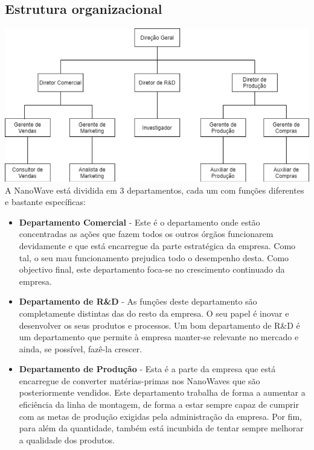\documentclass[a4paper]{article}
\begin{document}
\subsection{Estrutura organizacional}
\includegraphics[scale=0.7]{Imagem1.png}\\
A NanoWave está dividida em 3 departamentos, cada um com funções diferentes e bastante específicas:
\begin{itemize}
    \item \textbf{Departamento Comercial} - Este é o departamento onde estão concentradas as ações que fazem todos os outros órgãos funcionarem devidamente e que está encarregue da parte estratégica da empresa. Como tal, o seu mau funcionamento prejudica todo o desempenho desta. Como objectivo final, este departamento foca-se no crescimento continuado da empresa.
    \item \textbf{Departamento de R\&D} - As funções deste departamento são completamente distintas das do resto da empresa. O seu papel é inovar e desenvolver os seus produtos e processos. Um bom departamento de R\&D é um departamento que permite à empresa manter-se relevante no mercado e ainda, se possível, fazê-la crescer.
    \item \textbf{Departamento de Produção} - Esta é a parte da empresa que está encarregue de converter matérias-primas nos NanoWaves que são posteriormente vendidos. Este departamento trabalha de forma a aumentar a eficiência da linha de montagem, de forma a estar sempre capaz de cumprir com as metas de produção exigidas pela administração da empresa. Por fim, para além da quantidade, também está incunbida de tentar sempre melhorar a qualidade dos produtos.
\end{itemize}
\end{document}
